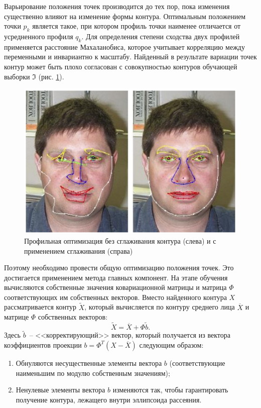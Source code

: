 Варьирование положения точек производится до тех пор, 
пока изменения существенно влияют на изменение формы контура. Оптимальным положением точки 
$p_k$ является такое, при 
котором профиль точки наименее отличается от усредненного 
профиля $q_k$.
Для определения степени сходства двух профилей 
применяется расстояние Махаланобиса, которое учитывает корреляцию между переменными и инвариантно к масштабу. 
Найденный в результате вариации точек контур может быть 
плохо согласован с совокупностью контуров обучающей выборки $\Im$ (рис. \ref{fig:crazy_face}).

\begin{figure}[hbt!]
    \centering
    \captionsetup{justification=centering}
    \includegraphics{crazy_face.png}
    \caption{Профильная оптимизация без сглаживания контура 
    (слева) и с применением сглаживания (справа)}
    \label{fig:crazy_face}
\end{figure}

Поэтому необходимо провести общую оптимизацию положения точек. Это достигается применением метода главных 
компонент. На этапе обучения вычисляются собственные значения ковариационной матрицы и матрица $\Phi$ соответствующих 
им собственных векторов. Вместо найденного контура $\mathit{X}$ рассматривается контур $\mathit{\widetilde{X}}$,
который вычисляется по контуру среднего лица $\overline{\mathit{X}}$ и матрице $\Phi$ собственных векторов:
$$\mathit{\widetilde{X}} = \overline{X} + \Phi\widetilde{b}.$$
Здесь $\widetilde{b}$~-- <<корректирующий>> вектор, который получается из вектора
коэффициентов проекции $b = \Phi^T(\mathit{X} - \overline{\mathit{X}})$ следующим образом:
\begin{enumerate}
    \item Обнуляются несущественные элементы вектора $b$ (соответствующие наименьшим по модулю собственным 
        значениям);
    \item Ненулевые элементы вектора 
        $b$ изменяются так, чтобы 
        гарантировать получение контура, лежащего внутри эллипсоида рассеяния. 
\end{enumerate}

